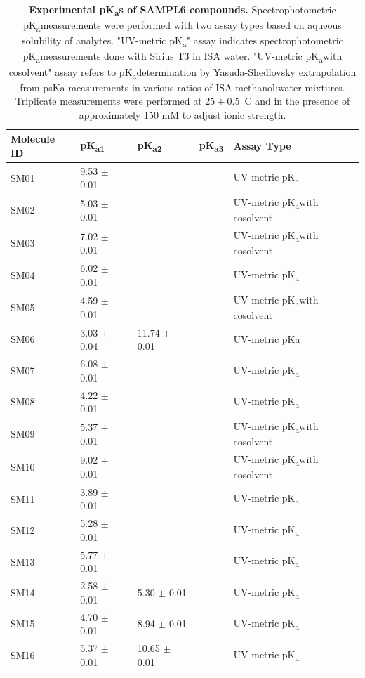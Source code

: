 \documentclass[9pt,lineno]{elife}
\newcommand{\pKa}{pK\textsubscript{a}}
\begin{document}
\begin{table}[tb!]
\begin{center}
\begin{threeparttable}
\centering
\caption{{\bf Experimental \pKa s of SAMPL6 compounds.} 
Spectrophotometric \pKa measurements were performed with two assay types based on aqueous solubility of analytes. "UV-metric \pKa" assay indicates spectrophotometric \pKa measurements done with Sirius T3 in ISA water. "UV-metric \pKa with cosolvent" assay refers to \pKa determination by Yasuda-Shedlovsky extrapolation from psKa measurements in various ratios of ISA methanol:water mixtures. Triplicate measurements were performed at $25 \pm 0.5$~\textdegree C and in the presence of approximately 150 mM  to adjust ionic strength.} 
\label{UV-metric_pKa_table}
\begin{tabular}{@{}lllll@{}}
\toprule
{\bf Molecule ID} & {\bf \pKa \textsubscript{1}} & {\bf \pKa \textsubscript{2}} & {\bf \pKa \textsubscript{3}} & {\bf Assay Type} \\ \midrule
SM01 & 9.53 $\pm$ 0.01 &  &  & UV-metric \pKa \\
SM02 & 5.03 $\pm$ 0.01 &  &  & UV-metric \pKa with cosolvent \\
SM03 & 7.02 $\pm$ 0.01 &  &  & UV-metric \pKa with cosolvent \\
SM04 & 6.02 $\pm$ 0.01 &  &  & UV-metric \pKa \\
SM05 & 4.59 $\pm$ 0.01 &  &  & UV-metric \pKa with cosolvent \\
SM06 & 3.03 $\pm$ 0.04 & 11.74 $\pm$ 0.01 &  & UV-metric pKa \\
SM07 & 6.08 $\pm$ 0.01 &  &  & UV-metric \pKa \\
SM08 & 4.22 $\pm$ 0.01 &  &  & UV-metric \pKa \\
SM09 & 5.37 $\pm$ 0.01 &  &  & UV-metric \pKa with cosolvent \\
SM10 & 9.02 $\pm$ 0.01 &  &  & UV-metric \pKa with cosolvent \\
SM11 & 3.89 $\pm$ 0.01 &  &  & UV-metric \pKa \\
SM12 & 5.28 $\pm$ 0.01 &  &  & UV-metric \pKa \\
SM13 & 5.77 $\pm$ 0.01 &  &  & UV-metric \pKa \\
SM14 & 2.58 $\pm$ 0.01 & 5.30 $\pm$ 0.01 &  & UV-metric \pKa \\
SM15 & 4.70 $\pm$ 0.01 & 8.94 $\pm$ 0.01 &  & UV-metric \pKa \\
SM16 & 5.37 $\pm$ 0.01 & 10.65 $\pm$ 0.01 &  & UV-metric \pKa \\

\end{tabular}
\end{threeparttable}
\end{center}
\end{table}
\end{document}
